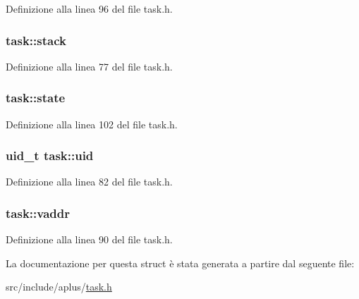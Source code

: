 Definizione alla linea 96 del file task.\+h.

\hypertarget{structtask_a71232ebd31259f41c057b3e789b44587}{
\subsubsection[{stack}]{ task\+::stack}}\label{structtask_a71232ebd31259f41c057b3e789b44587}


Definizione alla linea 77 del file task.\+h.

\hypertarget{structtask_a09ebd490ccb87f169fd7c3d8d95b4f39}{
\subsubsection[{state}]{ task\+::state}}\label{structtask_a09ebd490ccb87f169fd7c3d8d95b4f39}


Definizione alla linea 102 del file task.\+h.

\hypertarget{structtask_ade8fc4c414bce856dacf9efee3031be8}{
\subsubsection[{uid}]{\setlength{\rightskip}{0pt plus 5cm}uid\+\_\+t task\+::uid}}\label{structtask_ade8fc4c414bce856dacf9efee3031be8}


Definizione alla linea 82 del file task.\+h.

\hypertarget{structtask_a340cbedbdc4b542793e7677dd4966ade}{
\subsubsection[{vaddr}]{ task\+::vaddr}}\label{structtask_a340cbedbdc4b542793e7677dd4966ade}


Definizione alla linea 90 del file task.\+h.



La documentazione per questa struct è stata generata a partire dal seguente file\+:\begin{DoxyCompactItemize}
\item 
src/include/aplus/\hyperlink{task_8h}{task.\+h}\end{DoxyCompactItemize}
